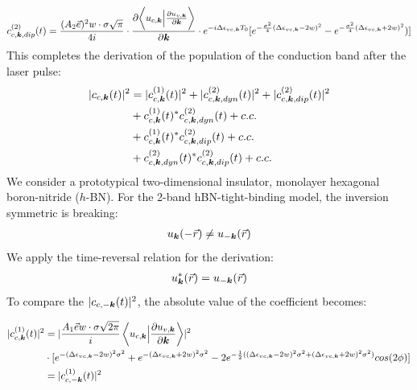 \begin{equation}
\begin{aligned}
    c^{(2)}_{c,\boldsymbol k,dip}(t)=\frac{(A_2 \vec e)^2 w \cdot \sigma \sqrt{\pi}}{4i} \cdot \frac{\partial{\left \langle u_{c,\boldsymbol k}\Big |\frac{\partial u_{v,\boldsymbol k}}{\partial \boldsymbol k} \right \rangle}}{\partial {\boldsymbol k}} \cdot e^{-i\Delta \epsilon_{vc,\boldsymbol k} T_0} [e^{-\frac{\sigma^2}{4} (\Delta \epsilon_{vc,\boldsymbol k}-2w)^2}-e^{-\frac{\sigma^2}{4} (\Delta \epsilon_{vc,\boldsymbol k}+2w)^2})]
\end{aligned}
\end{equation}
This completes the derivation of the population of the conduction band after the laser pulse:
\begin{equation}
\begin{aligned}
|c_{c,\boldsymbol k}(t)|^2&=|c^{(1)}_{c,\boldsymbol k}(t)|^2+|c^{(2)}_{c,\boldsymbol k,dyn}(t)|^2+|c^{(2)}_{c,\boldsymbol k,dip}(t)|^2\\
    &+ c^{(1)}_{c,\boldsymbol k}(t)^* c^{(2)}_{c,\boldsymbol k,dyn}(t) +c.c.\\
    &+c^{(1)}_{c,\boldsymbol k}(t)^* c^{(2)}_{c,\boldsymbol k,dip}(t)+c.c.\\
    &+c^{(2)}_{c,\boldsymbol k,dyn}(t)^* c^{(2)}_{c,\boldsymbol k,dip}(t)+c.c.
\end{aligned}
\end{equation}
We consider a prototypical two-dimensional insulator, monolayer hexagonal boron-nitride ($h$-BN). For the 2-band hBN-tight-binding model, the inversion symmetric is breaking:
\begin{align}
u_{\boldsymbol k}(-\vec r)\neq u_{-\boldsymbol k}(\vec r)    
\end{align}
We apply the time-reversal relation for the derivation:
\begin{align}
u^*_{\boldsymbol k}(\vec r)= u_{-\boldsymbol k}(\vec r)   
\end{align}
To compare the $|c_{c,-\boldsymbol k}(t)|^2$, the absolute value of the coefficient becomes:

\begin{equation}
\begin{aligned}
  |c^{(1)}_{c,\boldsymbol k}(t)|^2 &=  \lvert \frac{A_1 \vec e w \cdot \sigma \sqrt{2\pi}}{i} \left \langle u_{c,\boldsymbol k}\Big |\frac{\partial u_{v,\boldsymbol k}}{\partial \boldsymbol k} \right \rangle \rvert^2 \\
 & \cdot [e^{-(\Delta \epsilon_{vc,\boldsymbol k} - 2w)^2 \sigma^2}
    +e^{-(\Delta \epsilon_{vc,\boldsymbol k} + 2w)^2 \sigma^2}
    -2e^{-\frac{1}{2}((\Delta \epsilon_{vc,\boldsymbol k} - 2w)^2 \sigma^2
    +(\Delta \epsilon_{vc,\boldsymbol k} + 2w)^2 \sigma^2)}cos(2\phi)]\\
    &=  |c^{(1)}_{c,-\boldsymbol k}(t)|^2
\end{aligned}
\end{equation}

